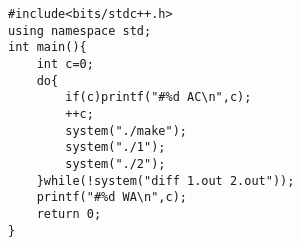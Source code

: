 \documentclass[E:/GsjzTle/main/main.tex]{subfiles}
\begin{document}
\begin{lstlisting}
#include<bits/stdc++.h>
using namespace std;
int main(){
	int c=0;
	do{
		if(c)printf("#%d AC\n",c);
		++c;
		system("./make");
		system("./1");
		system("./2");
	}while(!system("diff 1.out 2.out"));
	printf("#%d WA\n",c);
	return 0;
}
\end{lstlisting}
\end{document}
